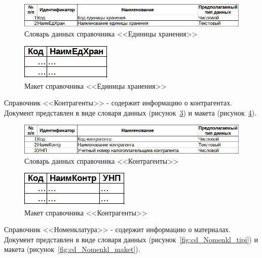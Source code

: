 \documentclass[12pt, a4paper, simple]{eskdtext}
\begin{document}
    \begin{figure}[!h]
        \centering
        \includegraphics[width=14cm]
            {_docs/СП_ЕдХран_типы.jpg}
        \caption{Словарь данных справочника <<Единицы хранения>>}
        \label{fig:cd_EdXran_tipi}
    \end{figure}

    \begin{figure}[!h]
        \centering
        \includegraphics[]
            {_docs/СП_ЕдХран_макет.jpg}
        \caption{Макет справочника <<Единицы хранения>>}
        \label{fig:cd_EdXran_maket}
    \end{figure}

    Справочник <<Контрагенты>> - содержит информацию о контрагентах.
    Документ представлен в виде словаря данных (рисунок~\ref{fig:cd_Kontrag_tipi})
    и макета (рисунок~\ref{fig:cd_Kontrag_maket}).

    \begin{figure}[!h]
        \centering
        \includegraphics[width=14cm]
            {_docs/СП_Контраг_типы.jpg}
        \caption{Словарь данных справочника <<Контрагенты>>}
        \label{fig:cd_Kontrag_tipi}
    \end{figure}

    \begin{figure}[!h]
        \centering
        \includegraphics[]
            {_docs/СП_Контраг_макет.jpg}
        \caption{Макет справочника <<Контрагенты>>}
        \label{fig:cd_Kontrag_maket}
    \end{figure}

    Справочник <<Номенклатура>> - содержит информацию о материалах.
    Документ представлен в виде словаря данных (рисунок~\ref{fig:cd_Nomenkl_tipi})
    и макета (рисунок~\ref{fig:cd_Nomenkl_maket}).
\end{document}
